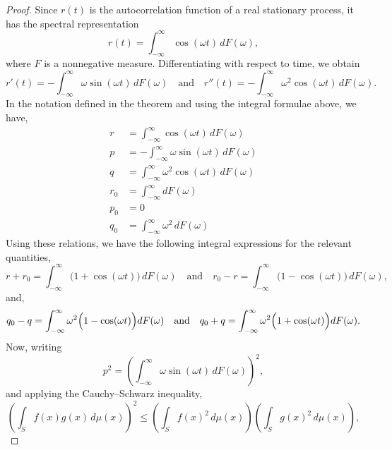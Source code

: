 \documentclass[10pt,a4paper]{amsart}
\begin{document}
\begin{proof}
Since $r(t)$ is the autocorrelation function of a real stationary process, it has the spectral representation
\begin{equation}
    r(t)=\int_{-\infty}^{\infty}\cos(\omega t)\,dF(\omega),
\end{equation}
where $F$ is a nonnegative measure. Differentiating with respect to time, we obtain
\begin{equation}
    r'(t)=-\int_{-\infty}^{\infty}\omega\sin(\omega t)\,dF(\omega)
    \quad\text{and}\quad
    r''(t)=-\int_{-\infty}^{\infty}\omega^2\cos(\omega t)\,dF(\omega).
\end{equation}
In the notation defined in the theorem and using the integral formulae above, we have,
\begin{equation}
\begin{split}
    r &= \int_{-\infty}^{\infty}\cos(\omega t)\,dF(\omega) \\
    p &= -\int_{-\infty}^{\infty}\omega\sin(\omega t)\,dF(\omega) \\
    q &= \int_{-\infty}^{\infty}\omega^2\cos(\omega t)\,dF(\omega) \\
    r_0 &= \int_{-\infty}^{\infty}dF(\omega) \\
    p_0 &= 0 \\
    q_0 &= \int_{-\infty}^{\infty}\omega^2 \,dF(\omega)
\end{split}
\end{equation}
Using these relations, we have the following integral expressions for the relevant quantities,
\begin{equation}
    r+r_0=\int_{-\infty}^{\infty}\bigl(1+\cos(\omega t)\bigr)\,dF(\omega)
    \quad\text{and}\quad
    r_0-r=\int_{-\infty}^{\infty}\bigl(1-\cos(\omega t)\bigr)\,dF(\omega),
\end{equation}
and,
\begin{equation}
    q_0-q=\int_{-\infty}^{\infty}\omega^2\Bigl(1-\cos(\omega t)\Bigr)dF(\omega)
    \quad\text{and}\quad
    q_0+q=\int_{-\infty}^{\infty}\omega^2\Bigl(1+\cos(\omega t)\Bigr)dF(\omega).    
\end{equation}
Now, writing
\begin{equation}
    p^2=\left(\int_{-\infty}^{\infty}\omega\sin(\omega t)\,dF(\omega)\right)^2,    
\end{equation}
and applying the Cauchy--Schwarz inequality,
\begin{equation}
\left( \int_{S} f(x) g(x) \, d\mu(x) \right)^2 \le \left( \int_{S} f(x)^2 \, d\mu(x) \right) \left( \int_{S} g(x)^2 \, d\mu(x) \right), 

\end{equation}
\end{proof}
\end{document}
